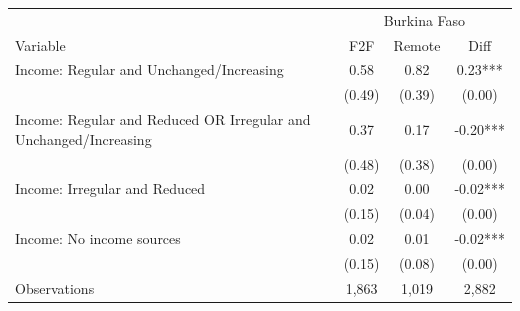 \begin{tabular}{l*{3}c}
\hline\hline
 & \multicolumn{3}{c}{Burkina Faso}\\ 
Variable & F2F & Remote & Diff \\
\hline
Income: Regular and Unchanged/Increasing&0.58&0.82&0.23***\\
&(0.49)&(0.39)&(0.00)\\
Income: Regular and Reduced OR Irregular and Unchanged/Increasing&0.37&0.17&-0.20***\\
&(0.48)&(0.38)&(0.00)\\
Income: Irregular and Reduced&0.02&0.00&-0.02***\\
&(0.15)&(0.04)&(0.00)\\
Income: No income sources&0.02&0.01&-0.02***\\
&(0.15)&(0.08)&(0.00)\\
\hline
Observations & 1,863 & 1,019 & 2,882 \\
\hline\hline
\end{tabular}
